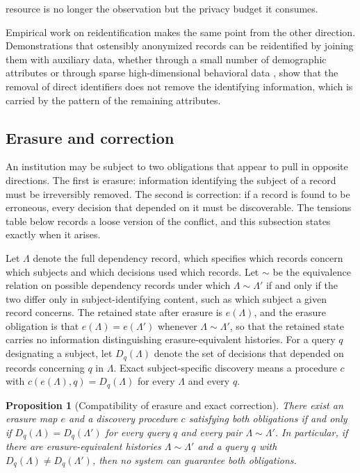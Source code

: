 \documentclass[11pt]{article}
\theoremstyle{plain}
\newtheorem{proposition}{Proposition}
\theoremstyle{definition}
\theoremstyle{remark}
\begin{document}
resource is no longer the observation but the privacy budget it consumes.

Empirical work on reidentification makes the same point from the other direction. Demonstrations that ostensibly anonymized records can be reidentified by joining them with auxiliary data, whether through a small number of demographic attributes \cite{sweeney2000} or through sparse high-dimensional behavioral data \cite{narayanan2008}, show that the removal of direct identifiers does not remove the identifying information, which is carried by the pattern of the remaining attributes.

\subsection{Erasure and correction}

An institution may be subject to two obligations that appear to pull in opposite directions. The first is erasure: information identifying the subject of a record must be irreversibly removed. The second is correction: if a record is found to be erroneous, every decision that depended on it must be discoverable. The tensions table below records a loose version of the conflict, and this subsection states exactly when it arises.

Let $\Lambda$ denote the full dependency record, which specifies which records concern which subjects and which decisions used which records. Let $\sim$ be the equivalence relation on possible dependency records under which $\Lambda\sim\Lambda'$ if and only if the two differ only in subject-identifying content, such as which subject a given record concerns. The retained state after erasure is $e(\Lambda)$, and the erasure obligation is that $e(\Lambda)=e(\Lambda')$ whenever $\Lambda\sim\Lambda'$, so that the retained state carries no information distinguishing erasure-equivalent histories. For a query $q$ designating a subject, let $D_q(\Lambda)$ denote the set of decisions that depended on records concerning $q$ in $\Lambda$. Exact subject-specific discovery means a procedure $c$ with $c(e(\Lambda),q)=D_q(\Lambda)$ for every $\Lambda$ and every $q$.

\begin{proposition}[Compatibility of erasure and exact correction]\label{prop:erasure}
There exist an erasure map $e$ and a discovery procedure $c$ satisfying both obligations if and only if $D_q(\Lambda)=D_q(\Lambda')$ for every query $q$ and every pair $\Lambda\sim\Lambda'$. In particular, if there are erasure-equivalent histories $\Lambda\sim\Lambda'$ and a query $q$ with $D_q(\Lambda)\neq D_q(\Lambda')$, then no system can guarantee both obligations.
\end{proposition}
\end{document}
